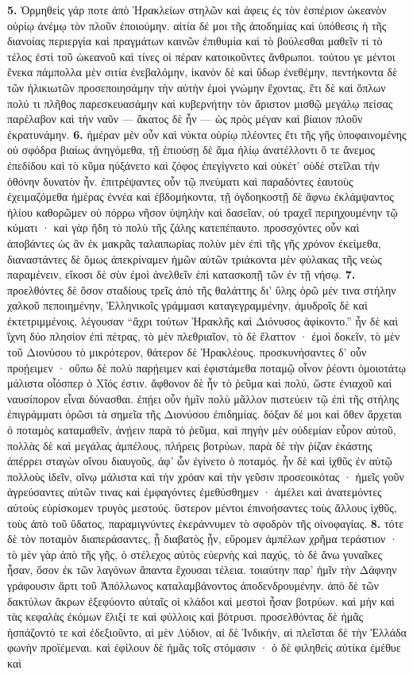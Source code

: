 \documentclass[a4paper, 11pt, oneside, polutonikogreek, german]{article}
\begin{document}
\textbf{5.} Ὁρμηθεὶς γάρ ποτε ἀπὸ Ἡρακλείων στηλῶν καὶ ἀφεις ἐς τὸν ἑσπέριον ὠκεανὸν οὐρίῳ ἀνέμῳ τὸν πλοῦν ἐποιούμην. αἰτία δέ μοι τῆς ἀποδημίας καὶ ὑπόθεσις ἡ τῆς διανοίας περιεργία καὶ πραγμάτων καινῶν ἐπιθυμία καὶ τὸ βούλεσθαι μαθεῖν τί τὸ τέλος ἐστὶ τοῦ ὠκεανοῦ καὶ τίνες οἱ πέραν κατοικοῦντες ἄνθρωποι. τούτου γε μέντοι ἕνεκα πάμπολλα μὲν σιτία ἐνεβαλόμην, ἱκανὸν δὲ καὶ ὕδωρ ἐνεθέμην, πεντήκοντα δὲ τῶν ἡλικιωτῶν προσεποιησάμην τὴν αὐτὴν ἐμοὶ γνώμην ἔχοντας, ἔτι δὲ καὶ ὅπλων πολύ τι πλῆθος παρεσκευασάμην καὶ κυβερνήτην τὸν ἄριστον μισθῷ μεγάλῳ πείσας παρέλαβον καὶ τὴν ναῦν --- ἄκατος δὲ ἦν --- ὡς πρὸς μέγαν καὶ βίαιον πλοῦν ἐκρατυνάμην. \textbf{6.} ἡμέραν μὲν οὖν καὶ νύκτα οὐρίῳ πλέοντες ἔτι τῆς γῆς ὑποφαινομένης οὐ σφόδρα βιαίως ἀνηγόμεθα, τῇ ἐπιούσῃ δὲ ἅμα ἡλίῳ ἀνατέλλοντι ὅ τε ἄνεμος ἐπεδίδου καὶ τὸ κῦμα ηὐξάνετο καὶ ζόφος ἐπεγίγνετο καὶ οὐκέτ' οὐδὲ στεῖλαι τὴν ὀθόνην δυνατὸν ἦν. ἐπιτρέψαντες οὖν τῷ πνεύματι καὶ παραδόντες ἑαυτοὺς ἐχειμαζόμεθα ἡμέρας ἐννέα καὶ ἑβδομήκοντα, τῇ ὀγδοηκοστῇ δὲ ἄφνω ἐκλάμψαντος ἡλίου καθορῶμεν οὐ πόρρω νῆσον ὑψηλὴν καὶ δασεῖαν, οὐ τραχεῖ περιηχουμένην τῷ κύματι · καὶ γὰρ ἤδη τὸ πολὺ τῆς ζάλης κατεπέπαυτο. προσσχόντες οὖν καὶ ἀποβάντες ὡς ἂν ἐκ μακρᾶς ταλαιπωρίας πολὺν μὲν ἐπὶ τῆς γῆς χρόνον ἐκείμεθα, διαναστάντες δὲ ὅμως ἀπεκρίναμεν ἡμῶν αὐτῶν τριάκοντα μὲν φύλακας τῆς νεὼς παραμένειν, εἴκοσι δὲ σὺν ἐμοὶ ἀνελθεῖν ἐπὶ κατασκοπῇ τῶν ἐν τῇ νήσῳ. \textbf{7.} προελθόντες δὲ ὅσον σταδίους τρεῖς ἀπὸ τῆς θαλάττης δι' ὕλης ὁρῶ μέν τινα στήλην χαλκοῦ πεποιημένην, Ἑλληνικοῖς γράμμασι καταγεγραμμένην, ἀμυδροῖς δὲ καὶ ἐκτετριμμένοις, λέγουσαν "`ἄχρι τούτων Ἡρακλῆς καὶ Διόνυσος ἀφίκοντο."' ἦν δὲ καὶ ἴχνη δύο πλησίον ἐπὶ πέτρας, τὸ μὲν πλεθριαῖον, τὸ δὲ ἔλαττον · ἐμοὶ δοκεῖν, τὸ μὲν τοῦ Διονύσου τὸ μικρότερον, θάτερον δὲ Ἡρακλέους. προσκυνήσαντες δ' οὖν προῄειμεν · οὔπω δὲ πολὺ παρῄειμεν καὶ ἐφιστάμεθα ποταμῷ οἶνον ῥέοντι ὁμοιοτάτῳ μάλιστα οἷόσπερ ὁ Χῖός ἐστιν. ἄφθονον δὲ ἧν τὸ ῥεῦμα καὶ πολύ, ὥστε ἐνιαχοῦ καὶ ναυσίπορον εἶναι δύνασθαι. ἐπῄει οὖν ἡμῖν πολὺ μᾶλλον πιστεύειν τῷ ἐπὶ τῆς στήλης ἐπιγράμματι ὁρῶσι τὰ σημεῖα τῆς Διονύσου ἐπιδημίας. δόξαν δέ μοι καὶ ὅθεν ἄρχεται ὁ ποταμὸς καταμαθεῖν, ἀνῄειν παρὰ τὸ ῥεῦμα, καὶ πηγὴν μὲν οὐδεμίαν εὗρον αὐτοῦ, πολλὰς δὲ καὶ μεγάλας ἀμπέλους, πλήρεις βοτρύων, παρὰ δὲ τὴν ῥίζαν ἑκάστης ἀπέρρει σταγὼν οἴνου διαυγοῦς, ἀφ' ὧν ἐγίνετο ὁ ποταμός. ἦν δὲ καὶ ἰχθῦς ἐν αὐτῷ πολλοὺς ἰδεῖν, οἴνῳ μάλιστα καὶ τὴν χρόαν καὶ τὴν γεῦσιν προσεοικότας · ἡμεῖς γοῦν ἀγρεύσαντες αὐτῶν τινας καὶ ἐμφαγόντες ἐμεθύσθημεν · ἀμέλει καὶ ἀνατεμόντες αὐτοὺς εὑρίσκομεν τρυγὸς μεστούς. ὕστερον μέντοι ἐπινοήσαντες τοὺς ἄλλους ἰχθῦς, τοὺς ἀπὸ τοῦ ὕδατος, παραμιγνύντες ἐκεράννυμεν τὸ σφοδρὸν τῆς οἰνοφαγίας. \textbf{8.} τότε δὲ τὸν ποταμὸν διαπεράσαντες, ᾗ διαβατὸς ᾖν, εὕρομεν ἀμπέλων χρῆμα τεράστιον · τὸ μὲν γὰρ ἀπὸ τῆς γῆς, ὁ στέλεχος αὐτὸς εὐερνὴς καὶ παχύς, τὸ δὲ ἄνω γυναῖκες ἦσαν, ὅσον ἐκ τῶν λαγόνων ἅπαντα ἔχουσαι τέλεια. τοιαύτην παρ' ἡμῖν τὴν Δάφνην γράφουσιν ἄρτι τοῦ Ἀπόλλωνος καταλαμβάνοντος ἀποδενδρουμένην. ἀπὸ δὲ τῶν δακτύλων ἄκρων ἐξεφύοντο αὐταῖς οἱ κλάδοι καὶ μεστοὶ ἦσαν βοτρύων. καὶ μὴν καὶ τὰς κεφαλὰς ἐκόμων ἕλιξί τε καὶ φύλλοις καὶ βότρυσι. προσελθόντας δὲ ἡμᾶς ἠσπάζοντό τε καὶ ἐδεξιοῦντο, αἱ μὲν Λύδιον, αἱ δὲ Ἰνδικήν, αἱ πλεῖσται δὲ τὴν Ἑλλάδα φωνὴν προϊέμεναι. καὶ ἐφίλουν δὲ ἡμᾶς τοῖς στόμασιν · ὁ δὲ φιληθεὶς αὐτίκα ἐμέθυε καὶ 
\end{document}
